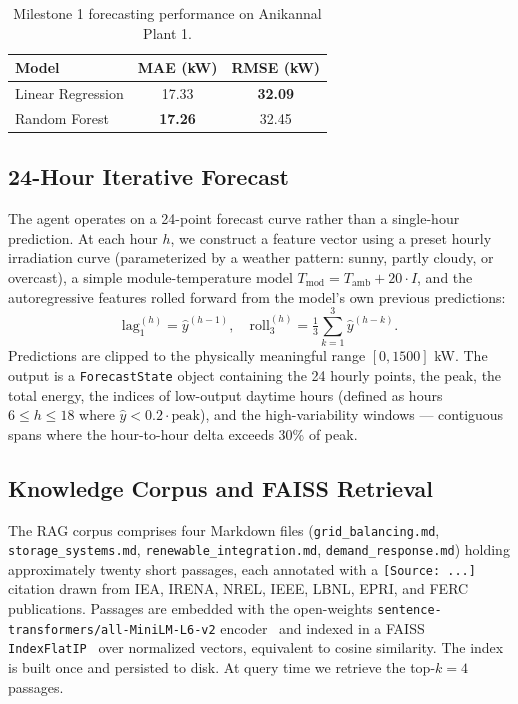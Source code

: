 \documentclass[journal,onecolumn,11pt]{IEEEtran}
\begin{document}
\begin{table}[ht]
\centering
\caption{Milestone 1 forecasting performance on Anikannal Plant 1.}
\label{tab:m1_metrics}
\begin{tabular}{lcc}
\toprule
Model & MAE (kW) & RMSE (kW) \\
\midrule
Linear Regression & 17.33 & \textbf{32.09} \\
Random Forest     & \textbf{17.26} & 32.45 \\
\bottomrule
\end{tabular}
\end{table}

\subsection{24-Hour Iterative Forecast}
The agent operates on a 24-point forecast curve rather than a single-hour prediction. At each hour $h$, we construct a feature vector using a preset hourly irradiation curve (parameterized by a weather pattern: sunny, partly cloudy, or overcast), a simple module-temperature model $T_{\text{mod}} = T_{\text{amb}} + 20 \cdot I$, and the autoregressive features rolled forward from the model's own previous predictions:
\begin{equation}
\text{lag}_1^{(h)} = \hat{y}^{(h-1)}, \quad
\text{roll}_3^{(h)} = \tfrac{1}{3} \sum_{k=1}^{3} \hat{y}^{(h-k)}.
\end{equation}
Predictions are clipped to the physically meaningful range $[0, 1500]$ kW. The output is a \texttt{ForecastState} object containing the 24 hourly points, the peak, the total energy, the indices of low-output daytime hours (defined as hours $6 \leq h \leq 18$ where $\hat{y} < 0.2 \cdot \text{peak}$), and the high-variability windows --- contiguous spans where the hour-to-hour delta exceeds 30\% of peak.

\subsection{Knowledge Corpus and FAISS Retrieval}
The RAG corpus comprises four Markdown files (\texttt{grid\_balancing.md}, \texttt{storage\_systems.md}, \texttt{renewable\_integration.md}, \texttt{demand\_response.md}) holding approximately twenty short passages, each annotated with a \texttt{[Source: ...]} citation drawn from IEA, IRENA, NREL, IEEE, LBNL, EPRI, and FERC publications. Passages are embedded with the open-weights \texttt{sentence-transformers/all-MiniLM-L6-v2} encoder~\citep{reimers2019sentencebert} and indexed in a FAISS \texttt{IndexFlatIP}~\citep{johnson2019faiss} over normalized vectors, equivalent to cosine similarity. The index is built once and persisted to disk. At query time we retrieve the top-$k=4$ passages.
\end{document}
